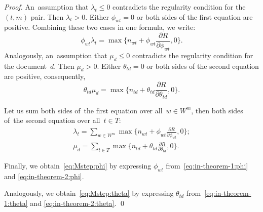 \documentclass{sig-alternate}
\begin{document}
\begin{proof}
    An~assumption that $\lambda_t\leq 0$ contradicts the regularity condition for the $(t,m)$ pair.
    Then ${\lambda_t>0}$.
    Either ${\phi_{wt}= 0}$ or both sides of the first equation are positive.
    Combining these two cases in one formula, we write:
    \begin{equation}
    \label{eq:in-theorem-1:phi}
        \phi_{wt} \lambda_t
        =
        \max\biggl\{
        n_{wt} + \phi_{wt} \frac{\partial R}{\partial \phi_{wt}}, 0
        \biggr\}.
    \end{equation}
    Analogously,
    an~assumption that $\mu_d\leq 0$ contradicts the regularity condition for the document~$d$.
    Then ${\mu_d>0}$.
    Either ${\theta_{td}= 0}$ or both sides of the second equation are positive,
    consequently,
    \begin{equation}
    \label{eq:in-theorem-1:theta}
        \theta_{td} \mu_d
        =
        \max\biggl\{
        n_{td} + \theta_{td} \frac{\partial R}{\partial \theta_{td}}, 0
        \biggr\}.
    \end{equation}

    Let us sum
    both sides of~the first equation over all~${w\in W^m}$,
    then
    both sides of~the second equation over all~${t\in T}$:
    \begin{gather}
    \label{eq:in-theorem-2:phi}
        \lambda_t
        =
        \sum_{w\in W^m}
        \max\biggl\{
        n_{wt} + \phi_{wt} \frac{\partial R}{\partial \phi_{wt}}, 0
        \biggr\};
    \\
    \label{eq:in-theorem-2:theta}
        \mu_d
        =
        \sum_{t\in T}
        \max\biggl\{
        n_{td} + \theta_{td} \frac{\partial R}{\partial \theta_{td}}, 0
        \biggr\}.
    \end{gather}

    Finally,
    we obtain~\eqref{eq:Mstep:phi} by expressing $\phi_{wt}$ from~\eqref{eq:in-theorem-1:phi} and \eqref{eq:in-theorem-2:phi}.

    Analogously,
    we obtain~\eqref{eq:Mstep:theta} by expressing $\theta_{td}$ from~\eqref{eq:in-theorem-1:theta} and \eqref{eq:in-theorem-2:theta}.
    \qed
\end{proof}
\end{document}
